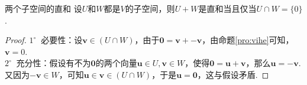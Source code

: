 \documentclass[lang=cn, zihao=5]{elegantbook}
\newcommand{\buzhou}[1]{$#1^{\circ} \ $}
\begin{document}
\begin{proposition}{两个子空间的直和}
    设$U$和$W$都是$V$的子空间，则$U+W$是直和当且仅当$U \cap W = \{ 0 \}$.
\end{proposition}
\begin{proof}
    \buzhou{1} 必要性：设$\boldsymbol{v} \in (U \cap W)$，由于$\boldsymbol{0} = \boldsymbol{v} + \boldsymbol{-v}$，由命题\ref{pro:vihe}可知，$\boldsymbol{v} = 0$. \\
    \buzhou{2} 充分性：假设有不为$\boldsymbol{0}$的两个向量$\boldsymbol{u} \in U,\boldsymbol{v} \in W$，使得$\boldsymbol{0} = \boldsymbol{u} + \boldsymbol{v}$，那么$\boldsymbol{u} = \boldsymbol{-v}$.又因为$\boldsymbol{-v} \in W$，可知$\boldsymbol{u} \in \boldsymbol{v} \in (U \cap W)$，于是$\boldsymbol{u}=\boldsymbol{0}$，这与假设矛盾.
\end{proof}
\end{document}
